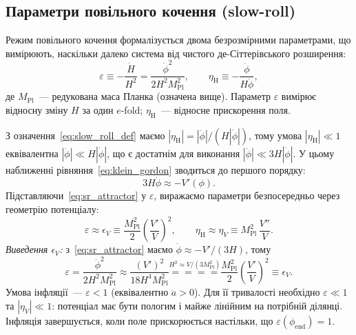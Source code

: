 \documentclass[12pt, a4paper]{article}
\begin{document}
\subsection{Параметри повільного кочення (slow-roll)}
\label{subsec:slowroll}

Режим повільного кочення формалізується двома безрозмірними
параметрами, що вимірюють, наскільки далеко система від чистого
де-Сіттерівського розширення:
\begin{equation}\label{eq:slow_roll_def}
  \varepsilon \equiv -\frac{\dot H}{H^2}
             = \frac{\dot\phi^2}{2H^2 M_\mathrm{Pl}^2},
  \qquad
  \eta_{\mathrm{H}} \equiv -\frac{\ddot{\phi}}{H\dot{\phi}},
\end{equation}
де $M_\mathrm{Pl}$~--- редукована маса Планка (означена вище).
Параметр $\varepsilon$ вимірює відносну зміну $H$ за один $e$-fold;
$\eta_{\mathrm{H}}$~--- відносне прискорення поля.


З означення~\eqref{eq:slow_roll_def} маємо
$|\eta_\mathrm{H}| = |\ddot\phi|/(H|\dot\phi|)$, тому умова
$|\eta_\mathrm{H}| \ll 1$ еквівалентна $|\ddot\phi| \ll H|\dot\phi|$,
що є достатнім для виконання $|\ddot\phi| \ll 3H|\dot\phi|$.
У цьому наближенні рівняння~\eqref{eq:klein_gordon} зводиться
до першого порядку:
\begin{equation}\label{eq:sr_attractor}
  3H\dot{\phi} \approx -V'(\phi).
\end{equation}
Підставляючи~\eqref{eq:sr_attractor} у $\varepsilon$, виражаємо
параметри безпосередньо через геометрію потенціалу:
\begin{equation}\label{eq:slow_roll_pot}
  \varepsilon \approx \epsilon_V
    \equiv \frac{M_\mathrm{Pl}^2}{2}\!\left(\frac{V'}{V}\right)^2,
  \qquad
  \eta_{\mathrm{H}} \approx \eta_V
    \equiv M_\mathrm{Pl}^2\,\frac{V''}{V}.
\end{equation}
\textit{Виведення $\epsilon_V$:} з~\eqref{eq:sr_attractor}
маємо $\dot\phi \approx -V'/(3H)$, тому
\begin{equation*}
  \varepsilon
    = \frac{\dot\phi^2}{2H^2 M_\mathrm{Pl}^2}
    \approx \frac{(V')^2}{18 H^4 M_\mathrm{Pl}^2}
    \overset{H^2\approx V/(3M_\mathrm{Pl}^2)}{=\!=\!=\!=}
    \frac{M_\mathrm{Pl}^2}{2}\!\left(\frac{V'}{V}\right)^2
    \equiv \epsilon_V.
\end{equation*}
Умова інфляції~--- $\varepsilon < 1$ (еквівалентно $\ddot{a} > 0$).
Для її тривалості необхідно $\varepsilon \ll 1$ та $|\eta_V| \ll 1$:
потенціал має бути пологим і майже лінійним на потрібній ділянці.
Інфляція завершується, коли поле прискорюється настільки, що
$\varepsilon(\phi_{\mathrm{end}}) = 1$.
\end{document}
